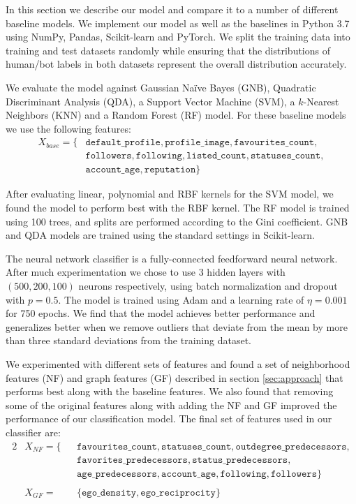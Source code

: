 In this section we describe our model and compare it to a number of different baseline models. We implement our model as well as the baselines in Python 3.7 using NumPy, Pandas, Scikit-learn and PyTorch. We split the training data into training and test datasets randomly while ensuring that the distributions of human/bot labels in both datasets represent the overall distribution accurately.

We evaluate the model against Gaussian Naïve Bayes (GNB), Quadratic Discriminant Analysis (QDA), a Support Vector Machine (SVM), a $k$-Nearest Neighbors (KNN) and a Random Forest (RF) model. For these baseline models we use the following features:
\begin{align*}
    X_{base} = \{ & \texttt{default\_profile}, \texttt{profile\_image}, \texttt{favourites\_count}, \\
    & \texttt{followers}, \texttt{following}, \texttt{listed\_count}, \texttt{statuses\_count}, \\
    & \texttt{account\_age}, \texttt{reputation} \}
\end{align*}

After evaluating linear, polynomial and RBF kernels for the SVM model, we found the model to perform best with the RBF kernel. The RF model is trained using 100 trees, and splits are performed according to the Gini coefficient. GNB and QDA models are trained using the standard settings in Scikit-learn. 

The neural network classifier is a fully-connected feedforward neural network. After much experimentation we chose to use 3 hidden layers with $(500, 200, 100)$ neurons respectively, using batch normalization and dropout with $p=0.5$. The model is trained using Adam and a learning rate of $\eta = 0.001$ for 750 epochs. We find that the model achieves better performance and generalizes better when we remove outliers that deviate from the mean by more than three standard deviations from the training dataset.

We experimented with different sets of features and found a set of neighborhood features (NF) and graph features (GF) described in section \ref{sec:approach} that performs best along with the baseline features. We also found that removing some of the original features along with adding the  NF and GF improved the performance of our classification model. The final set of features used in our classifier are:
\begin{alignat*}{2}
    & X_{NF} = \{ && \texttt{favourites\_count}, \texttt{statuses\_count}, \texttt{outdegree\_predecessors}, \\
    & && \texttt{favorites\_predecessors}, \texttt{status\_predecessors}, \\
    & && \texttt{age\_predecessors}, \texttt{account\_age}, \texttt{following}, \texttt{followers} \} \\
    \\
    & X_{GF} = && \{ \texttt{ego\_density}, \texttt{ego\_reciprocity} \}
\end{alignat*}

